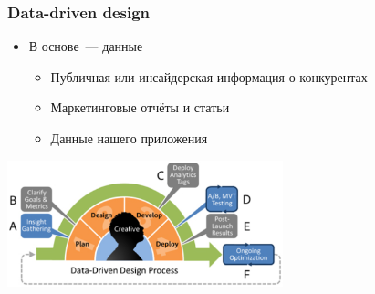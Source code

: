 \documentclass{../../slides-style}
\begin{document}
    \begin{frame}
        \frametitle{Data-driven design}
        \begin{itemize}
            \item В основе~--- данные
            \begin{itemize}
                \item Публичная или инсайдерская информация о конкурентах
                \item Маркетинговые отчёты и статьи
                \item Данные нашего приложения
            \end{itemize}
        \end{itemize}
        \begin{center}
            \includegraphics[width=0.6\textwidth]{dataDrivenDesign.png}
        \end{center}
    \end{frame}
\end{document}

